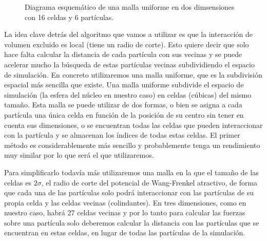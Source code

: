 \begin{figure}[t]
    \centering
    \caption{Diagrama esquemático de una malla uniforme en dos dimsensiones  con 16 celdas y 6 partículas.}
    \label{fig:grid-diagram}
\end{figure}

La idea clave detrás del algoritmo que vamos a utilizar es que la interacción de volumen excluido es local (tiene un radio de corte). Esto quiere decir que solo hace falta calcular la distancia de cada partícula con sus vecinas y se puede acelerar mucho la búsqueda de estas partículas vecinas subdividiendo el espacio de simulación. En concreto utilizaremos una malla uniforme, que es la subdivisión espacial más sencilla que existe. Una malla uniforme subdivide el espacio de simulación (la esfera del núcleo en nuestro caso) en celdas (cúbicas) del mismo tamaño. Esta malla se puede utilizar de dos formas, o bien se asigna a cada partícula una única celda en función de la posición de su centro sin tener en cuenta sus dimensiones, o se encuentran todas las celdas que pueden interaccionar con la partícula y se almacenan los índices de todas estas celdas. El primer método es considerablemente más sencillo y probablemente tenga un rendimiento muy similar por lo que será el que utilizaremos.

Para simplificarlo todavía más utilizaremos una malla en la que el tamaño de las celdas es $2\sigma$, el radio de corte del potencial de Wang-Frenkel atractivo, de forma que cada una de las partículas solo podrá interaccionar con las partículas de su propia celda y las celdas vecinas (colindantes). En tres dimensiones, como en nuestro caso, habrá 27 celdas vecinas y por lo tanto para calcular las fuerzas sobre una partícula solo deberemos calcular la distancia con las partículas que se encuentran en estas celdas, en lugar de todas las partículas de la simulación.

